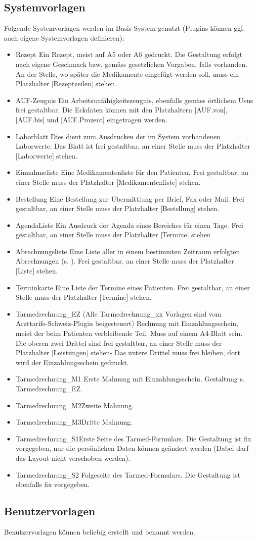 \subsection{Systemvorlagen}
Folgende Systemvorlagen werden im Basis-System genutzt (Plugins können ggf. auch
eigene Systemvorlagen definieren):
\begin{itemize}
  \item {Rezept} Ein Rezept, meist auf A5 oder A6 gedruckt. Die Gestaltung
  erfolgt nach eigene Geschmack bzw. gemäss gesetzlichen Vorgaben, falls
  vorhanden. An der Stelle, wo später die Medikamente eingefügt werden soll,
  muss ein Platzhalter [Rezeptzeilen] stehen.
  \item {AUF-Zeugnis} Ein Arbeitsunfähigkeitszeugnis, ebenfalls gemäss örtlichem
  Usus frei gestaltbar. Die Eckdaten können mit den Platzhaltern [AUF.von],
  [AUF.bis] und [AUF.Prozent] eingetragen werden.
  \item {Laborblatt} Dies dient zum Ausdrucken der im System vorhandenen
  Laborwerte. Das Blatt ist frei gestaltbar, an einer Stelle muss der
  Platzhalter [Laborwerte] stehen.
  \item {Einnahmeliste} Eine Medikamentenliste für den Patienten. Frei
  gestaltbar, an einer Stelle muss der Platzhalter [Medikamentenliste] stehen.
  \item {Bestellung} Eine Bestellung zur Übermittlung per Brief, Fax oder Mail.
  Frei gestaltbar, an einer Stelle muss der Platzhalter [Bestellung] stehen.
  \item {AgendaListe} Ein Ausdruck der Agenda eines Bereiches für einen Tage.
  Frei gestaltbar, an einer Stelle muss der Platzhalter [Termine] stehen
  \item {Abrechnungsliste} Eine Liste aller in einem bestimmten Zeitraum
  erfolgten Abrechnungen (s. \pageref{fig:konnd}). Frei gestaltbar, an einer
  Stelle muss der Platzhalter [Liste] stehen.
  \item {Terminkarte} Eine Liste der Termine eines Patienten. Frei gestaltbar,
  an einer Stelle muss der Platzhalter [Termine] stehen.
  \item {Tarmedrechnung\_EZ} (Alle Tarmedrechnung\_xx Vorlagen sind vom
  Arzttarife-Schweiz-Plugin beigesteuert) Rechnung mit Einzahlungsschein, meist
  der beim Patienten verbleibende Teil. Muss auf einem A4-Blatt sein. Die oberen
  zwei Drittel sind frei gestaltbar, an einer Stelle muss der Platzhalter
  [Leistungen] stehen- Das untere Drittel muss frei bleiben, dort wird der
  Einzahlungsschein gedruckt.
  \item {Tarmedrechnung\_M1} Erste Mahnung mit Einzahlungsschein. Gestaltung s. Tarmedrechnung\_EZ.
  \item {Tarmedrechnung\_M2}Zweite Mahnung.
  \item {Tarmedrechnung\_M3}Dritte Mahnung.
  \item {Tarmedrechnung\_S1}Erste Seite des Tarmed-Formulars. Die Gestaltung ist
  fix vorgegeben, nur die persönlichen Daten können geändert werden (Dabei darf
  das Layout nicht verschoben werden).
  \item {Tarmedrechnung\_S2} Folgeseite des Tarmed-Formulars. Die Gestaltung ist
  ebenfalls fix vorgegeben.
\end{itemize}


\subsection{Benutzervorlagen}
Benutzervorlagen können beliebig erstellt und benannt werden.
